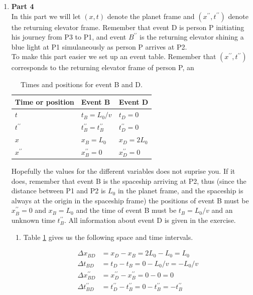\documentclass[a4paper,10pt,english]{article}
\begin{document}
\begin{enumerate}
\item \textbf{Part 4}\\
In this part we will let $(x,t)$ denote the planet frame and $(x^{\prime\prime},t^{\prime\prime})$ denote the returning elevator frame. Remember that event D is person P initiating his journey from P3 to P1, and event $B^{\prime\prime}$ is the returning elevator shining a blue light at P1 simulaneously as person P arrives at P2.
\\
To make this part easier we set up an event table. Remember that $(x^{\prime\prime},t^{\prime\prime})$ corresponds to the returning elevator frame of person P, an

\begin{table}[H]
  \begin{center}
    \begin{tabular}{| l | l | l |}
   	\hline
	 Time or position & Event B & Event D\\ \hline
	 $t$ & $t_{B}=L_{0}/v$ & $t_{D}=0$ \\ \hline
	 $t^{\prime\prime}$ & $t^{\prime\prime}_{B}=t^{\prime\prime}_{B}$ & $t_{D}^{\prime\prime}=0$\\ \hline
	 $x$ & $x_{B}=L_{0}$ & $x_{D}=2L_{0}$\\ \hline
	 $x^{\prime\prime}$ & $x^{\prime\prime}_{B}=0$ & $x_{D}^{\prime\prime}=0$\\ \hline
	\end{tabular}
    \caption{Times and positions for event B and D.}
    \label{table:ex_2A_8}
  \end{center}
\end{table}
\FloatBarrier

Hopefully the values for the different variables does not suprise you. If it does, remember that event B is the spaceship arriving at P2, thus (since the distance between P1 and P2 is $L_{0}$ in the planet frame, and the spaceship is always at the origin in the spaceship frame) the positions of event B must be $x^{\prime\prime}_{B}=0$ and $x_{B}=L_{0}$ and the time of event B must be $t_{B}=L_{0}/v$ and an unknown time $t^{\prime\prime}_{B}$. All information about event D is given in the exercise.

\begin{enumerate}

\item Table \ref{table:ex_2A_8} gives us the following space and time intervals.

\begin{align*}
\Delta x_{BD}&=x_{D}-x_{B}=2L_{0}-L_{0}=L_{0}\\
\Delta t_{BD}&=t_{D}-t_{B}=0-L_{0}/v=-L_{0}/v\\
\Delta x^{\prime\prime}_{BD}&=x^{\prime\prime}_{D}-x^{\prime\prime}_{B}=0-0=0\\
\Delta t^{\prime\prime}_{BD}&=t^{\prime\prime}_{D}-t_{B}^{\prime\prime}=0-t_{B}^{\prime\prime}=-t_{B}^{\prime\prime}
\end{align*}


\end{enumerate}
\end{enumerate}
\end{document}
